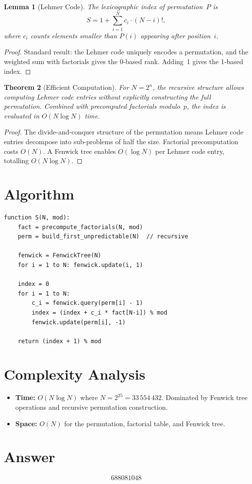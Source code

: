 \documentclass[11pt]{article}
\newtheorem{theorem}{Theorem}
\newtheorem{lemma}[theorem]{Lemma}
\begin{document}
\begin{lemma}[Lehmer Code]
The lexicographic index of permutation~$P$ is
\[
S = 1 + \sum_{i=1}^{N} c_i \cdot (N-i)!,
\]
where $c_i$ counts elements smaller than $P(i)$ appearing after position~$i$.
\end{lemma}

\begin{proof}
Standard result: the Lehmer code uniquely encodes a permutation, and the weighted sum with factorials gives the 0-based rank. Adding~1 gives the 1-based index.
\end{proof}

\begin{theorem}[Efficient Computation]
For $N=2^n$, the recursive structure allows computing Lehmer code entries without explicitly constructing the full permutation. Combined with precomputed factorials modulo~$p$, the index is evaluated in $O(N\log N)$ time.
\end{theorem}

\begin{proof}
The divide-and-conquer structure of the permutation means Lehmer code entries decompose into sub-problems of half the size. Factorial precomputation costs $O(N)$. A Fenwick tree enables $O(\log N)$ per Lehmer code entry, totalling $O(N\log N)$.
\end{proof}

\section{Algorithm}

\begin{verbatim}
function S(N, mod):
    fact = precompute_factorials(N, mod)
    perm = build_first_unpredictable(N)  // recursive

    fenwick = FenwickTree(N)
    for i = 1 to N: fenwick.update(i, 1)

    index = 0
    for i = 1 to N:
        c_i = fenwick.query(perm[i] - 1)
        index = (index + c_i * fact[N-i]) % mod
        fenwick.update(perm[i], -1)

    return (index + 1) % mod
\end{verbatim}

\section{Complexity Analysis}

\begin{itemize}
    \item \textbf{Time:} $O(N \log N)$ where $N = 2^{25} = 33\,554\,432$. Dominated by Fenwick tree operations and recursive permutation construction.
    \item \textbf{Space:} $O(N)$ for the permutation, factorial table, and Fenwick tree.
\end{itemize}

\section{Answer}

\[
\boxed{688081048}
\]
\end{document}

